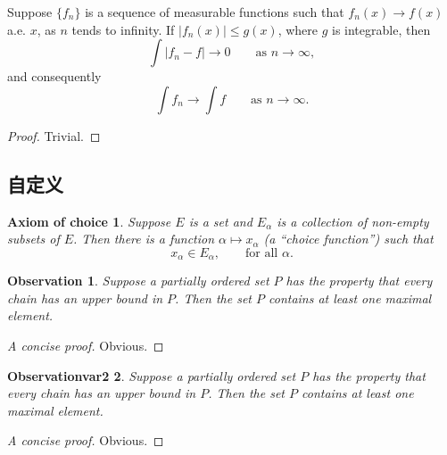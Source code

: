 \begin{theorem}
  Suppose $\{f_n\}$ is a sequence of measurable functions such that
  $f_n(x) \to f(x)$ a.e. $x$, as $n$ tends to infinity.
  If $|f_n(x)| \leq g(x)$, where $g$ is integrable, then
  \begin{equation}
  \int |f_n - f| \to 0 \qquad \text{as } n \to \infty,
  \end{equation}
  and consequently
  \begin{equation}
  \int f_n \to \int f \qquad \text{as } n \to \infty.
  \end{equation}
\end{theorem}

\begin{proof}
  Trivial.
\end{proof}



\subsection{自定义}

\newtheorem*{axiomofchoice}{Axiom of choice}
\begin{axiomofchoice}
  Suppose $E$ is a set and ${E_\alpha}$ is a collection of
  non-empty subsets of $E$. Then there is a function $\alpha
  \mapsto x_\alpha$ (a ``choice function'') such that
  \begin{equation}
  x_\alpha \in E_\alpha,\qquad \text{for all }\alpha.
  \end{equation}
\end{axiomofchoice}

\newtheorem{observation}{Observation}[chapter]
\begin{observation}
  Suppose a partially ordered set $P$ has the property
  that every chain has an upper bound in $P$. Then the
  set $P$ contains at least one maximal element.
\end{observation}
\begin{proof}[A concise proof]
  Obvious.
\end{proof}

\newtheorem{observationvar2}[observation]{Observationvar2}
\begin{observationvar2}
  Suppose a partially ordered set $P$ has the property
  that every chain has an upper bound in $P$. Then the
  set $P$ contains at least one maximal element.
\end{observationvar2}
\begin{proof}[A concise proof]
  Obvious.
\end{proof}

